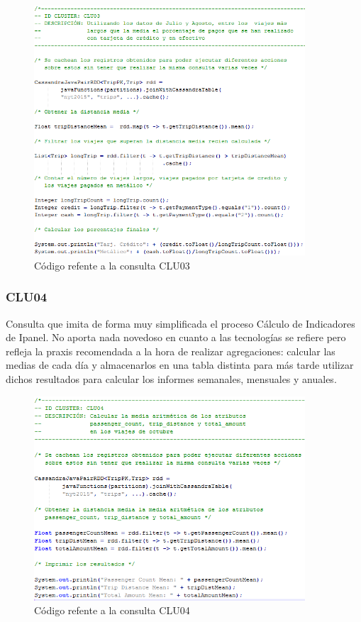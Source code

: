 \begin{figure}[h]
	\centering
	\includegraphics[width=0.9\textwidth]{Ilustraciones/CLU03.png}
	\caption{Código refente a la consulta CLU03}
	\label{fig:consulta_clu03}
\end{figure}

\clearpage

\subsubsection[]{CLU04}

Consulta que imita de forma muy simplificada el proceso Cálculo de Indicadores de Ipanel. No aporta nada novedoso en cuanto a las tecnologías se refiere
pero refleja la praxis recomendada a la hora de realizar agregaciones: calcular las medias de cada día y almacenarlos en una tabla distinta para más tarde utilizar dichos resultados para calcular los informes semanales, mensuales y anuales.\\

\begin{figure}[h]
	\centering
	\includegraphics[width=0.9\textwidth]{Ilustraciones/CLU04.png}
	\caption{Código refente a la consulta CLU04}
\end{figure}


